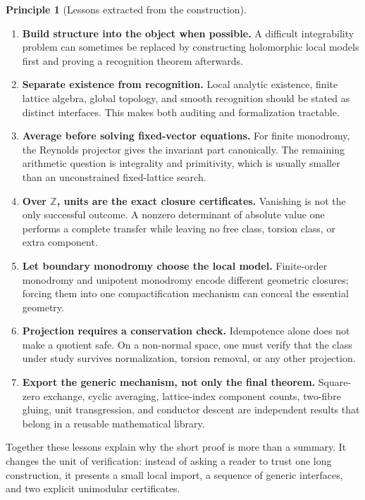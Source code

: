 \documentclass[11pt,reqno]{amsart}
\numberwithin{equation}{section}
\newcommand{\Z}{\mathbb Z}
\theoremstyle{definition}
\newtheorem{principle}[theorem]{Principle}
\begin{document}
\begin{principle}[Lessons extracted from the construction]\label{pr:lessons}
\begin{enumerate}[label=\textup{(\arabic*)}]
\item \textbf{Build structure into the object when possible.} A difficult integrability problem can sometimes be replaced by constructing holomorphic local models first and proving a recognition theorem afterwards.
\item \textbf{Separate existence from recognition.} Local analytic existence, finite lattice algebra, global topology, and smooth recognition should be stated as distinct interfaces. This makes both auditing and formalization tractable.
\item \textbf{Average before solving fixed-vector equations.} For finite monodromy, the Reynolds projector gives the invariant part canonically. The remaining arithmetic question is integrality and primitivity, which is usually smaller than an unconstrained fixed-lattice search.
\item \textbf{Over $\Z$, units are the exact closure certificates.} Vanishing is not the only successful outcome. A nonzero determinant of absolute value one performs a complete transfer while leaving no free class, torsion class, or extra component.
\item \textbf{Let boundary monodromy choose the local model.} Finite-order monodromy and unipotent monodromy encode different geometric closures; forcing them into one compactification mechanism can conceal the essential geometry.
\item \textbf{Projection requires a conservation check.} Idempotence alone does not make a quotient safe. On a non-normal space, one must verify that the class under study survives normalization, torsion removal, or any other projection.
\item \textbf{Export the generic mechanism, not only the final theorem.} Square-zero exchange, cyclic averaging, lattice-index component counts, two-fibre gluing, unit transgression, and conductor descent are independent results that belong in a reusable mathematical library.
\end{enumerate}
\end{principle}

Together these lessons explain why the short proof is more than a summary. It changes the unit of verification: instead of asking a reader to trust one long construction, it presents a small local import, a sequence of generic interfaces, and two explicit unimodular certificates.
\end{document}
